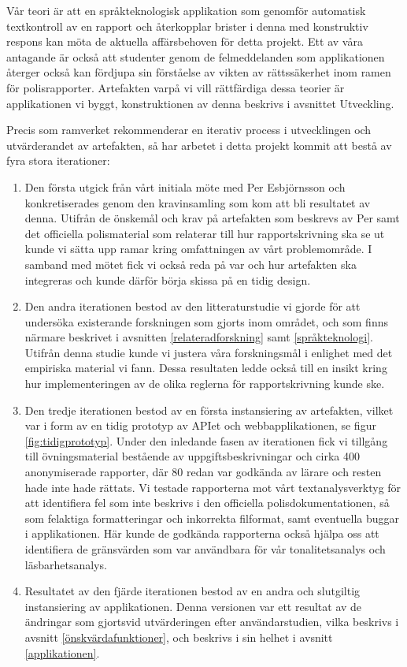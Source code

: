 \documentclass[swedish]{maucsthesis}
\begin{document}
Vår teori är att en språkteknologisk applikation som genomför automatisk
textkontroll av en rapport och återkopplar brister i denna med konstruktiv
respons kan möta de aktuella affärsbehoven för detta projekt. Ett av våra
antagande är också att studenter genom de felmeddelanden som applikationen
återger också kan fördjupa sin förståelse av vikten av rättssäkerhet inom ramen
för polisrapporter. Artefakten varpå vi vill rättfärdiga dessa teorier är
applikationen vi byggt, konstruktionen av denna beskrivs i avsnittet Utveckling.

Precis som ramverket rekommenderar en iterativ process i utvecklingen och
utvärderandet av artefakten, så har arbetet i detta projekt kommit att bestå av
fyra stora iterationer:

\begin{enumerate}
\item Den första utgick från vårt initiala möte med Per Esbjörnsson och
  konkretiserades genom den kravinsamling som kom att bli resultatet av denna.
  Utifrån de önskemål och krav på artefakten som beskrevs av Per samt det
  officiella polismaterial som relaterar till hur rapportskrivning ska se ut
  kunde vi sätta upp ramar kring omfattningen av vårt problemområde. I samband
  med mötet fick vi också reda på var och hur artefakten ska integreras och
  kunde därför börja skissa på en tidig design.
\item Den andra iterationen bestod av den litteraturstudie vi gjorde för att
  undersöka existerande forskningen som gjorts inom området, och som finns
  närmare beskrivet i avsnitten \ref{relateradforskning} samt \ref{språkteknologi}.
  Utifrån denna studie kunde vi justera våra forskningsmål i enlighet med det
  empiriska material vi fann. Dessa resultaten ledde också till en insikt kring
  hur implementeringen av de olika reglerna för rapportskrivning kunde ske.
\item Den tredje iterationen bestod av en första instansiering av artefakten,
  vilket var i form av en tidig prototyp av APIet och webbapplikationen, se
  figur \ref{fig:tidigprototyp}. Under den inledande fasen av iterationen fick
  vi tillgång till övningsmaterial bestående av uppgiftsbeskrivningar och cirka
  400 anonymiserade rapporter, där 80 redan var godkända av lärare och resten
  hade inte hade rättats. Vi testade rapporterna mot vårt textanalysverktyg för
  att identifiera fel som inte beskrivs i den officiella polisdokumentationen,
  så som felaktiga formatteringar och inkorrekta filformat, samt eventuella
  buggar i applikationen. Här kunde de godkända rapporterna också hjälpa oss att
  identifiera de gränsvärden som var användbara för vår tonalitetsanalys och
  läsbarhetsanalys.
\item Resultatet av den fjärde iterationen bestod av en andra och slutgiltig
  instansiering av applikationen. Denna versionen var ett resultat av de
  ändringar som gjortsvid utvärderingen efter användarstudien, vilka beskrivs i
  avsnitt \ref{önskvärdafunktioner}, och beskrivs i sin helhet i
  avsnitt \ref{applikationen}.
\end{enumerate}
\end{document}
